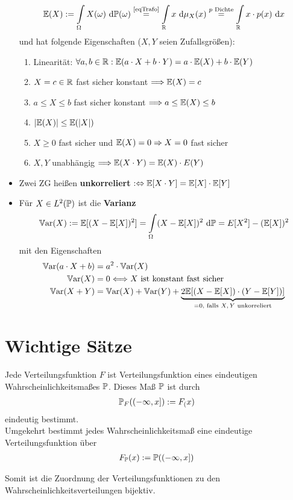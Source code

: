 \begin{itemize}
\begin{align*}
\E(X):=\int\limits_\Omega X(\omega)\d\P(\omega)
\stackeq{\text{\ref{eqTrafo}}}
\int\limits_\R x\d\mu_X (x)
\stackeq{p\text{ Dichte}}
\int\limits_\R x\cdot p(x)\d x
\end{align*}
und hat folgende Eigenschaften ($X,Y$ seien Zufallsgrößen):
\begin{enumerate}
\item Linearität: $\forall a,b\in\R:\E(a\cdot X+b\cdot Y)=a\cdot \E(X)+b\cdot\E(Y)$
\item $X=c\in\R$ fast sicher konstant $\Longrightarrow\E(X)=c$
\item $a\leq X\leq b$ fast sicher konstant $\Longrightarrow a\leq\E(X)\leq b$
\item $|\E(X)|\leq\E(|X|)$
\item $X\geq0$ fast sicher und $\E(X)=0\Rightarrow X=0$ fast sicher
\item $X,Y$ unabhängig $\Longrightarrow\E(X\cdot Y)=\E(X)\cdot E(Y)$
\end{enumerate}
\item Zwei ZG heißen \textbf{unkorreliert} $:\gdw\E[X\cdot Y]=\E[X]\cdot\E[Y]$
\item Für $X\in L^2(\P)$ ist die \textbf{Varianz} 
\begin{align*}
\Var(X):=\E[(X-\E[X])^2]=\int\limits_\Omega(X-\E[X])^2\d\P=E[X^2]-(\E[X])^2
\end{align*}
mit den Eigenschaften
\begin{align*}
\Var(a\cdot X+b)&=a^2\cdot\Var(X)\\
\Var(X)&=0\Longleftrightarrow X\text{ ist konstant fast sicher}\\
\Var(X+Y)&=\Var(X)+\Var(Y)+\underbrace{2\E[(X-\E[X])\cdot(Y-\E[Y])]}_{=0\text{, falls $X,Y$ unkorreliert}}
\end{align*}
\end{itemize}

\section{Wichtige Sätze}
\begin{satz}[Korrespondenzsatz]\label{satzKorrespondenzsatz}\enter
Jede Verteilungsfunktion $F$ ist Verteilungsfunktion eines eindeutigen Wahrscheinlichkeitsmaßes $\P$. Dieses Maß $\P$ ist durch
\begin{align*}
\P_F((-\infty,x]):=F_(x)
\end{align*}
eindeutig bestimmt.\\
Umgekehrt bestimmt jedes Wahrscheinlichkeitsmaß eine eindeutige Verteilungsfunktion über
\begin{align*}
F_{\P}(x):=\P((-\infty,x])
\end{align*}

Somit ist die Zuordnung der Verteilungsfunktionen zu den Wahrscheinlichkeitsverteilungen bijektiv. 
\end{satz}

